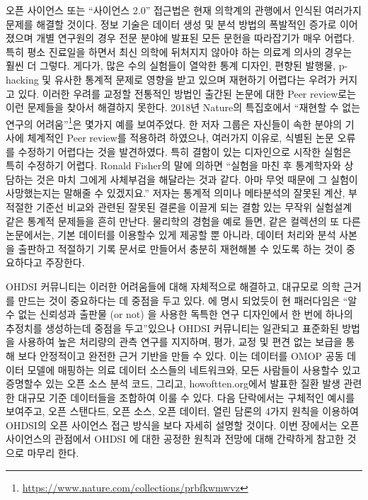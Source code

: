 \documentclass[11pt]{book}
\let\rmarkdownfootnote\footnote%
\def\footnote{\protect\rmarkdownfootnote}
\theoremstyle{definition}
\theoremstyle{definition}
\theoremstyle{definition}
\theoremstyle{remark}
\begin{document}
오픈 사이언스 또는 ``사이언스 2.0'' \citep{wiki:Science_2.0} 접근법은
현재 의학계의 관행에서 인식된 여러가지 문제를 해결할 것이다. 정보 기술은
데이터 생성 및 분석 방법의 폭발적인 증가로 이어졌으며 개별 연구원의 경우
전문 분야에 발표된 모든 문헌을 따라잡기가 매우 어렵다. 특히 평소
진료일을 하면서 최신 의학에 뒤처지지 않아야 하는 의료계 의사의 경우는
훨씬 더 그렇다. 게다가, 많은 수의 실험들이 열악한 통계 디자인, 편향된
발행물, p-hacking 및 유사한 통계적 문제로 영향을 받고 있으며 재현하기
어렵다는 우려가 커지고 있다. 이러한 우려를 교정할 전통적인 방법인 출간된
논문에 대한 Peer review로는 이런 문제들을 찾아서 해결하지 못한다. 2018년
Nature의 특집호에서 ``재현할 수 없는 연구의 어려움''\footnote{\url{https://www.nature.com/collections/prbfkwmwvz}}은
몇가지 예를 보여주었다. 한 저자 그룹은 자신들이 속한 분야의 기사에
체계적인 Peer review를 적용하려 하였으나, 여러가지 이유로, 식별된 논문
오류를 수정하기 어렵다는 것을 발견하였다. 특히 결함이 있는 디자인으로
시작한 실험은 특히 수정하기 어렵다. Ronald Fisher의 말에 의하면 ``실험을
마친 후 통계학자와 상담하는 것은 마치 그에게 사체부검을 해달라는 것과
같다. 아마 무엇 때문에 그 실험이 사망했는지는 말해줄 수 있겠지요.''
\citep{wikiquote:Ronald_Fisher} 저자는 통계적 의미나 메타분석의 잘못된
계산, 부적절한 기준선 비교와 관련된 잘못된 결론을 이끌게 되는 결함 있는
무작위 실험설계 같은 통계적 문제들을 흔히 만난다. \citep{allison_2016}
물리학의 경험을 예로 들면, 같은 컬렉션의 또 다른 논문에서는, 기본
데이터를 이용할수 있게 제공할 뿐 아니라, 데이터 처리와 분석 사본을
출판하고 적절하기 기록 문서로 만들어서 충분히 재현해볼 수 있도록 하는
것이 중요하다고 주장한다. \citep{Chen2018}

OHDSI 커뮤니티는 이러한 어려움들에 대해 자체적으로 해결하고, 대규모로
의학 근거를 만드는 것이 중요하다는 데 중점을 두고 있다.
\citet{schuemie_2018b} 에 명시 되었듯이 현 패러다임은 ``알 수 없는
신뢰성과 출판물 (or not) 을 사용한 독특한 연구 디자인에서 한 번에 하나의
추정치를 생성하는데 중점을 두고''있으나 OHDSI 커뮤니티는 일관되고
표준화된 방법을 사용하여 높은 처리량의 관측 연구를 지지하며, 평가, 교정
및 편견 없는 보급을 통해 보다 안정적이고 완전한 근거 기반을 만들 수
있다. 이는 데이터를 OMOP 공동 데이터 모델에 매핑하는 의료 데이터
소스들의 네트워크와, 모든 사람들이 사용할수 있고 증명할수 있는 오픈 소스
분석 코드, 그리고, howoftten.org에서 발표한 질환 발생 관련한 대규모 기준
데이터들을 조합하여 이룰 수 있다. 다음 단락에서는 구체적인 예시를
보여주고, 오픈 스탠다드, 오픈 소스, 오픈 데이터, 열린 담론의 4가지
원칙을 이용하여 OHDSI의 오픈 사이언스 접근 방식을 보다 자세히 설명할
것이다. 이번 장에서는 오픈 사이언스의 관점에서 OHDSI 에 대한 공정한
원칙과 전망에 대해 간략하게 참고한 것으로 마무리 한다.
\end{document}
